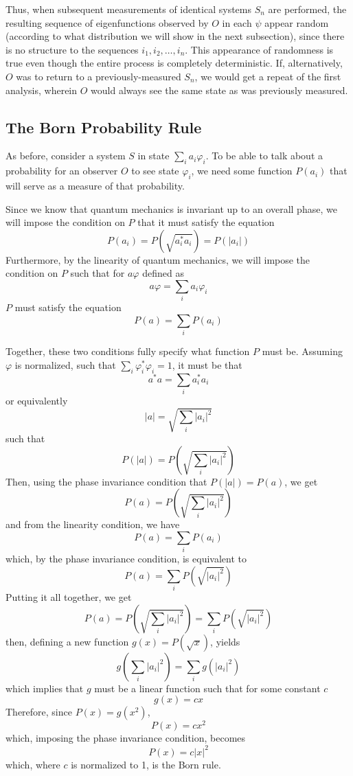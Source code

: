 \documentclass[
    12pt,
    letterpaper,
    aps,
    prd,
    longbibliography,
    twocolumn,
    nofootinbib,
    raggedbottom,
    amsmath,
    amssymb,
    amsfonts,
]{revtex4-1}
\newcommand{\pn}[1]{\left(#1\right)}
\newcommand{\abs}[1]{\left|#1\right|}
\renewcommand{\phi}{\varphi}
\begin{document}
Thus, when subsequent measurements of identical systems $S_n$ are performed, the resulting sequence of eigenfunctions observed by $O$ in each $\psi$ appear random (according to what distribution we will show in the next subsection), since there is no structure to the sequences $i_1, i_2, \ldots, i_n$. This appearance of randomness is true even though the entire process is completely deterministic. If, alternatively, $O$ was to return to a previously-measured $S_n$, we would get a repeat of the first analysis, wherein $O$ would always see the same state as was previously measured.

\subsection{The Born Probability Rule}
\label{sec:born}

As before, consider a system $S$ in state $\sum_i a_i \phi_i$. To be able to talk about a probability for an observer $O$ to see state $\phi_i$, we need some function $P(a_i)$ that will serve as a measure of that probability.

Since we know that quantum mechanics is invariant up to an overall phase, we will impose the condition on $P$ that it must satisfy the equation
\[
    P(a_i) = P\pn{\sqrt{a_i^* a_i}} = P(\abs{a_i})
\]
Furthermore, by the linearity of quantum mechanics, we will impose the condition on $P$ such that for $a \phi$ defined as
\[
    a \phi = \sum_i a_i \phi_i
\]
$P$ must satisfy the equation
\[
    P(a) = \sum_i P(a_i)
\]

Together, these two conditions fully specify what function $P$ must be. Assuming $\phi$ is normalized, such that $\sum_i \phi_i^* \phi_i = 1$, it must be that
\[
    a^* a = \sum_i a_i^* a_i
\]
or equivalently
\[
    \abs{a} = \sqrt{\sum_i \abs{a_i}^2}
\]
such that
\[
    P(\abs{a}) = P\pn{\sqrt{\sum_i \abs{a_i}^2}}
\]
Then, using the phase invariance condition that $P(\abs{a}) = P(a)$, we get
\[
    P(a) = P\pn{\sqrt{\sum_i \abs{a_i}^2}}
\]
and from the linearity condition, we have
\[
    P(a) = \sum_i P(a_i)
\]
which, by the phase invariance condition, is equivalent to
\[
    P(a) = \sum_i P\pn{\sqrt{\abs{a_i}^2}}
\]
Putting it all together, we get
\[
    P(a) = P\pn{\sqrt{\sum_i \abs{a_i}^2}} = \sum_i P\pn{\sqrt{\abs{a_i}^2}}
\]
then, defining a new function $g(x) = P(\sqrt{x})$, yields
\[
    g\pn{\sum_i \abs{a_i}^2} = \sum_i g\pn{\abs{a_i}^2}
\]
which implies that $g$ must be a linear function such that for some constant $c$
\[
    g(x) = c x
\]
Therefore, since $P(x) = g(x^2)$,
\[
    P(x) = c x^2
\]
which, imposing the phase invariance condition, becomes
\[
    P(x) = c \abs{x}^2
\]
which, where $c$ is normalized to 1, is the Born rule.
\end{document}
